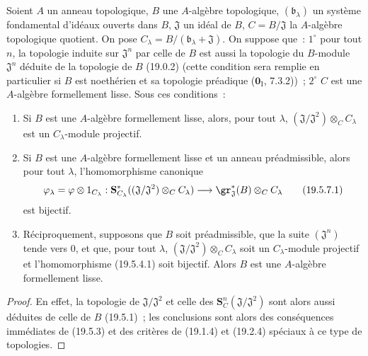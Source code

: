 \begin{corollary}[19.5.7]
\label{0.19.5.7-fr}
Soient $A$ un anneau topologique, $B$ une $A$-algèbre topologique,
$(\mathfrak b_\lambda)$ un système fondamental d'idéaux ouverts dans $B$,
$\mathfrak J$ un idéal de $B$, $C=B/\mathfrak J$ la $A$-algèbre topologique
quotient. On pose $C_\lambda=B/(\mathfrak b_\lambda+\mathfrak J)$. On suppose
que~: $1^\circ$ pour tout $n$, la topologie induite sur $\mathfrak J^n$ par
celle de $B$ est aussi la topologie du $B$-module $\mathfrak J^n$ déduite de
la topologie de $B$ (19.0.2) (cette condition sera remplie en particulier si
$B$ est noethérien et sa topologie préadique ($\mathbf 0_{\mathrm I}$,
7.3.2))~; $2^\circ$ $C$ est une $A$-algèbre formellement lisse. Sous ces
conditions~:
\begin{enumerate}
  \item[\rm(i)] Si $B$ est une $A$-algèbre formellement lisse, alors, pour tout
  $\lambda$, $(\mathfrak J/\mathfrak J^2)\otimes_C C_\lambda$ est un
  $C_\lambda$-module projectif.
  \item[\rm(ii)] Si $B$ est une $A$-algèbre formellement lisse et un anneau
  préadmissible, alors pour tout $\lambda$, l'homomorphisme canonique
  \begin{equation}
  \label{0.19.5.7.1-fr}
    \varphi_\lambda=\varphi\otimes 1_{C_\lambda}:
    \mathbf S_{C_\lambda}^*((\mathfrak J/\mathfrak J^2)\otimes_C C_\lambda)
    \longrightarrow\gr_{\mathfrak J}^*(B)\otimes_C C_\lambda
    \tag{19.5.7.1}
  \end{equation}
  est bijectif.


  \item[\rm(iii)] Réciproquement, supposons que $B$ soit préadmissible, que la
  suite $(\mathfrak J^n)$ tende vers $0$, et que, pour tout $\lambda$,
  $(\mathfrak J/\mathfrak J^2)\otimes_C C_\lambda$ soit un $C_\lambda$-module
  projectif et l'homomorphisme (19.5.4.1) soit bijectif. Alors $B$ est une
  $A$-algèbre formellement lisse.
\end{enumerate}
\end{corollary}

\begin{proof}
En effet, la topologie de $\mathfrak J/\mathfrak J^2$ et celle des
$\mathbf S_C^n(\mathfrak J/\mathfrak J^2)$ sont alors aussi déduites de celle
de $B$ (19.5.1)~; les conclusions sont alors des conséquences immédiates de
(19.5.3) et des critères de (19.1.4) et (19.2.4) spéciaux à ce type de
topologies.
\end{proof}

